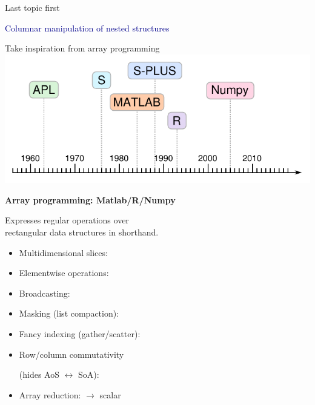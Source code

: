 \documentclass[aspectratio=169]{beamer}
\begin{document}
\begin{frame}{Last topic first}
\Large
\vspace{1 cm}
\begin{center}
\textcolor{darkblue}{Columnar manipulation of nested structures}
\end{center}
\end{frame}

\begin{frame}[fragile]{Take inspiration from array programming}
\vspace{0.1 cm}
\hfill \includegraphics[height=2.75 cm]{apl-timeline.pdf}

\vspace{-2.15 cm}
{\bf\large Array programming: Matlab/R/Numpy}

\vspace{0.5 cm}
Expresses regular operations over \\ rectangular data structures in shorthand.

\vspace{0.25 cm}
\begin{itemize}\setlength{\itemsep}{0.15 cm}
\item Multidimensional slices: 
\item Elementwise operations: 
\item Broadcasting: 
\item Masking (list compaction): 
\item Fancy indexing (gather/scatter): 
\item Row/column commutativity 

(hides AoS $\leftrightarrow$ SoA): 
\item Array reduction:  $\to$ scalar
\end{itemize}
\end{frame}
\end{document}
